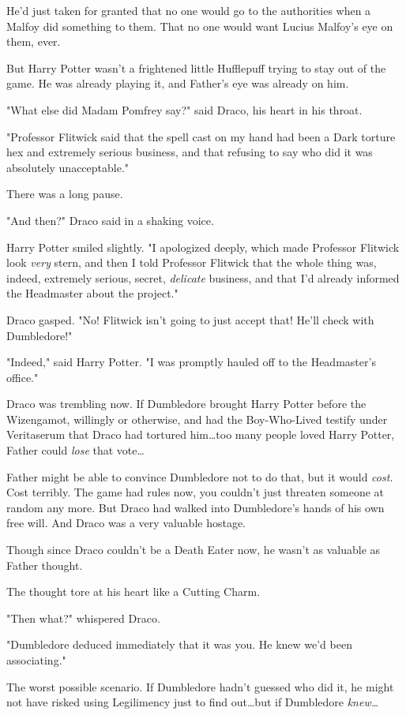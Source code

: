 He'd just taken for granted that no one would go to the authorities when a
Malfoy did something to them. That no one would want Lucius Malfoy's eye on
them, ever.

But Harry Potter wasn't a frightened little Hufflepuff trying to stay out of
the game. He was already playing it, and Father's eye was already on him.

"What else did Madam Pomfrey say?" said Draco, his heart in his throat.

"Professor Flitwick said that the spell cast on my hand had been a Dark torture
hex and extremely serious business, and that refusing to say who did it was
absolutely unacceptable."

There was a long pause.

"And then?" Draco said in a shaking voice.

Harry Potter smiled slightly. "I apologized deeply, which made Professor
Flitwick look \emph{very} stern, and then I told Professor Flitwick that the
whole thing was, indeed, extremely serious, secret, \emph{delicate} business,
and that I'd already informed the Headmaster about the project."

Draco gasped. "No! Flitwick isn't going to just accept that! He'll check with
Dumbledore!"

"Indeed," said Harry Potter. "I was promptly hauled off to the Headmaster's
office."

Draco was trembling now. If Dumbledore brought Harry Potter before the
Wizengamot, willingly or otherwise, and had the Boy-Who-Lived testify under
Veritaserum that Draco had tortured him…too many people loved Harry
Potter, Father could \emph{lose} that vote…

Father might be able to convince Dumbledore not to do that, but it would
\emph{cost.} Cost terribly. The game had rules now, you couldn't just threaten
someone at random any more. But Draco had walked into Dumbledore's hands of his
own free will. And Draco was a very valuable hostage.

Though since Draco couldn't be a Death Eater now, he wasn't as valuable as
Father thought.

The thought tore at his heart like a Cutting Charm.

"Then what?" whispered Draco.

"Dumbledore deduced immediately that it was you. He knew we'd been associating."

The worst possible scenario. If Dumbledore hadn't guessed who did it, he might
not have risked using Legilimency just to find out…but if Dumbledore
\emph{knew…}

